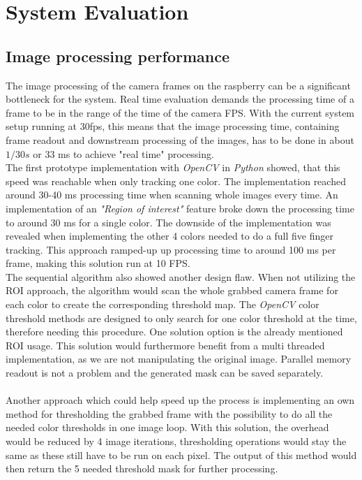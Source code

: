 \chapter{System Evaluation}
\section{Image processing performance}
The image  processing of the camera frames on the raspberry can be a significant bottleneck for the system. Real time evaluation demands the processing time of a frame to be in the range of the time of the camera FPS. With the current system setup running at 30fps, this means that the image processing time, containing frame readout and downstream processing of the images, has to be done in about $1/30s$ or 33 ms to achieve "real time" processing.\\ 
The first prototype implementation with \textit{OpenCV} in \textit{Python} showed, that this speed was reachable when only tracking one color. The implementation reached around 30-40 ms processing time when scanning whole images every time. An implementation of an \textit{"Region of interest"} feature  broke down the processing time to around 30 ms for a single color. The downside of the implementation was revealed when implementing the other 4 colors needed to do a full five finger tracking. This approach ramped-up up processing time to around 100 ms per frame, making this solution run at 10 FPS.\\ 
The sequential algorithm also showed another design flaw. When not utilizing the ROI approach, the algorithm would scan the whole grabbed camera frame for each color to create the corresponding threshold map. The \textit{OpenCV} color threshold methods are designed to only search for one color threshold at the time, therefore needing this procedure. One solution option is the already mentioned ROI usage. This solution would furthermore benefit from a multi threaded implementation, as we are not manipulating the original image. Parallel memory readout is not a problem and the generated mask can be saved separately.\\
\\
Another approach which could help speed up the process is implementing an own method for thresholding the grabbed frame with the possibility to do all the needed color thresholds in one image loop. With this solution, the overhead would be reduced by 4 image iterations, thresholding operations would stay the same as these still have to be run on each pixel. The output of this method would then return the 5 needed threshold mask for further processing.\\
